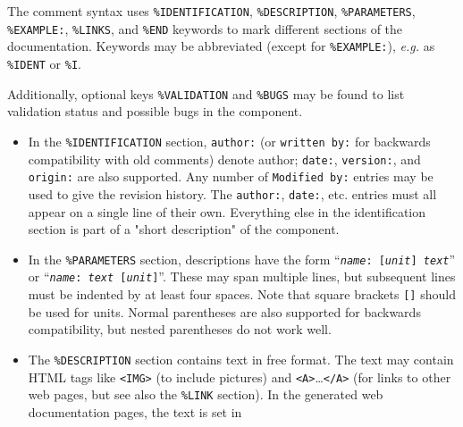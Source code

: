 The comment syntax uses \verb+%IDENTIFICATION+, \verb+%DESCRIPTION+,
\verb+%PARAMETERS+, \verb+%EXAMPLE:+, \verb+%LINKS+, and \verb+%END+
keywords to mark different sections of the documentation. Keywords may
be abbreviated (except for \verb+%EXAMPLE:+), \textit{e.g.} as \verb+%IDENT+ or \verb+%I+.

Additionally, optional keys \verb+%VALIDATION+ and \verb+%BUGS+ may be found to list validation status and possible bugs in the component.

\begin{itemize}
\item
  In the \verb+%IDENTIFICATION+
  section, \verb+author:+ (or \verb+written by:+ for backwards
  compatibility with old comments) denote author; \verb+date:+,
  \verb+version:+, and \verb+origin:+ are also supported. Any number of
  \verb+Modified by:+ entries may be used to give the revision history.
  The \verb+author:+, \verb+date:+, etc. entries must all
  appear on a single line of their own. Everything else in the
  identification section is part of a "short description" of the
  component.
\item
  In the \verb+%PARAMETERS+
  section, descriptions have the form
  \hbox{``\texttt{\textit{name\/}:~[\textit{unit\/}] \textit{text\/}}''}
  or \hbox{``\texttt{\textit{name\/}:~\textit{text\/} [\textit{unit\/}]}''}.
  These may span multiple lines, but subsequent lines must be
  indented by at least four spaces. Note that square brackets \verb+[]+ should
  be used for units. Normal parentheses are also supported for backwards
  compatibility, but nested parentheses do not work well.
\item
  The \verb+%DESCRIPTION+
  section contains text in free format. The text may contain HTML tags
  like \verb+<IMG>+ (to include pictures) and
  \verb+<A>+\ldots\verb+</A>+
  (for links to other web pages, but see also the \verb+%LINK+
  section). In the generated web documentation pages, the text is set in

\end{itemize}
